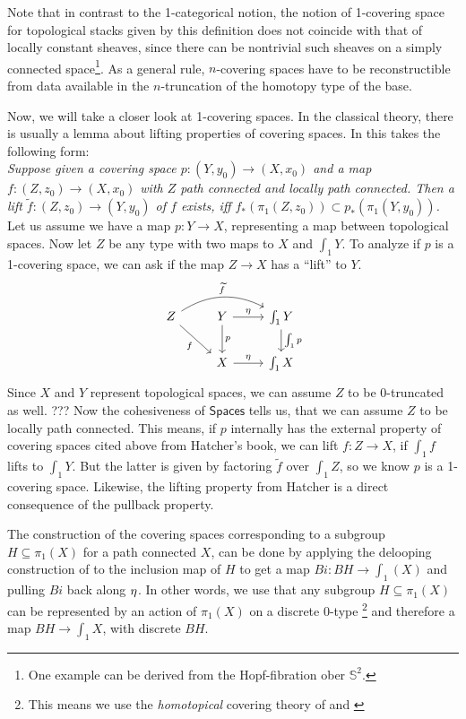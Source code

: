 \documentclass[9pt,twosided]{amsart}
\newcommand{\shape}{\int}
\newcommand{\bS}{\mathbb S}
\newcommand{\Spaces}{\ensuremath{\mathsf{Spaces}}}
\begin{document}
Note that in contrast to the 1-categorical notion, the notion of 1-covering space for topological stacks given by this definition does not coincide with that of locally constant sheaves, since there can be nontrivial such sheaves on a simply connected space\footnote{One example can be derived from the Hopf-fibration ober $\bS^2$.}.
As a general rule, $n$-covering spaces have to be reconstructible from data available in the $n$-truncation of the homotopy type of the base. 

Now, we will take a closer look at 1-covering spaces.
In the classical theory, there is usually a lemma about lifting properties of covering spaces.
In \cite[Proposition 1.33, p. 61]{Hatcher} this takes the following form: \\
\emph{Suppose given a covering space $p:({Y},{y}_0)\to (X,x_0)$ and a map $f:(Z,z_0)\to (X,x_0)$
  with $Z$ path connected and locally path connected.
  Then a lift $\widetilde{f}:(Z,z_0)\to(Y,{y}_0)$ of $f$ exists, iff $f_\ast(\pi_1(Z,z_0))\subset p_\ast(\pi_1({Y},{y}_0))$.} \\
Let us assume we have a map $p:Y\to X$, representing a map between topological spaces.
Now let $Z$ be any type with two maps to $X$ and $\shape_1 Y$.
To analyze if $p$ is a 1-covering space, we can ask if the map $Z\to X$ has a ``lift'' to $Y$.
\begin{equation*}
\begin{tikzcd}
Z\arrow[dr, swap, "f"]\arrow[rr, bend left=30, "\widetilde{f}"]  & Y\arrow[r, "\modalunit"]\arrow[d, "p"] & \shape_1 Y\arrow[d, "\shape_1 p"] \\
& X\arrow[r, "\modalunit"]  & \shape_1 X 
\end{tikzcd}
\end{equation*}
Since $X$ and $Y$ represent topological spaces, we can assume $Z$ to be 0-truncated as well.
??? Now the cohesiveness of $\Spaces$ tells us, that we can assume $Z$ to be locally path connected.
This means, if $p$ internally has the external property of covering spaces cited above from Hatcher's book, we can lift $f:Z\to X$, if $\shape_1 f$ lifts to $\shape_1 Y$.
But the latter is given by factoring $\widetilde{f}$ over $\shape_1 Z$, so we know $p$ is a 1-covering space.
Likewise, the lifting property from Hatcher is a direct consequence of the pullback property. 

The construction of the covering spaces corresponding to a subgroup $H\subseteq \pi_1(X)$ for a path connected $X$,
can be done by applying the delooping construction of \cite{LicataFinster} to the inclusion map of $H$ to get a map $Bi:BH\to\shape_1(X)$ and pulling $Bi$ back along ${\eta_{}}$. In other words, we use that any subgroup $H\subseteq\pi_1(X)$ can be represented by an action of $\pi_1(X)$ on a discrete 0-type
\footnote{This means we use the \emph{homotopical} covering theory of \cite[Section 3.1]{favonia-thesis} 
and \cite[Section 7.1]{ulrik-egbert-floris-groups}}
and therefore a map $BH\to \shape_1X$, with discrete $BH$.
\end{document}
